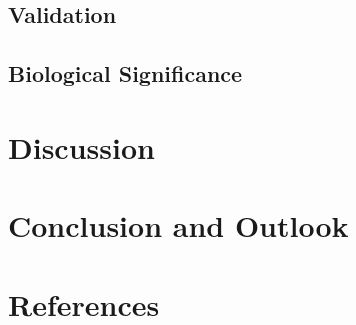 \documentclass{article}
\begin{document}
\subsection{Validation}
\subsection{Biological Significance}
\section{Discussion}
\section{Conclusion and Outlook}

\section{References}
%


\end{document}
